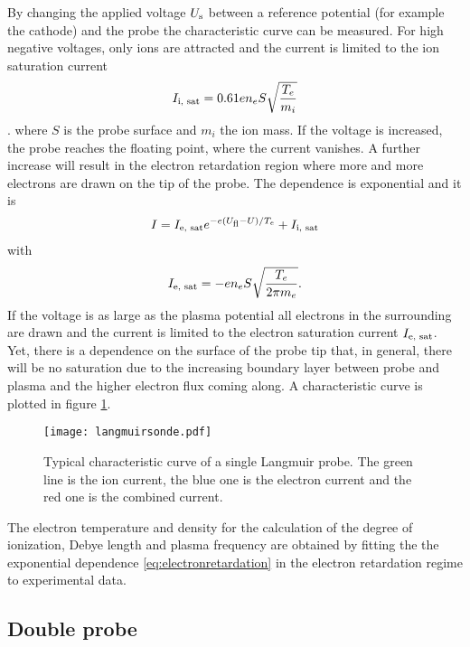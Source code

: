 By changing the applied voltage $U_{\text{\scriptsize s}}$ between a reference potential (for example the cathode) and the probe the characteristic curve can be measured. For high negative voltages, only ions are attracted and the current is limited to the ion saturation current
\begin{align}
	\label{eq:ionsatcurrent}
	I_{\text{\scriptsize i, sat}} = 0.61 e n_e S \sqrt{\frac{T_e}{m_i}}
\end{align}. 
where $S$ is the probe surface and $m_i$ the ion mass. If the voltage is increased, the probe reaches the floating point, where the current vanishes. A further increase will result in the electron retardation region where more and more electrons are drawn on the tip of the probe. The dependence is exponential and it is
\begin{align}
	\label{eq:electronretardation}
	I = I_{\text{\scriptsize e, sat}} e^{-e(U_{\text{\scriptsize fl}} - U)/T_e} + I_{\text{\scriptsize i, sat}}
\end{align}
with\begin{align}
	\label{eq:electronsatcurrent}
	I_{\text{\scriptsize e, sat}} = - e n_e S \sqrt{\frac{T_e}{2 \pi m_e}} \scriptsize{.}
\end{align}
If the voltage is as large as the plasma potential all electrons in the surrounding are drawn and the current is limited to the electron saturation current $I_{\text{\scriptsize e, sat}}$. Yet, there is a dependence on the surface of the probe tip that, in general, there will be no saturation due to the increasing boundary layer between probe and plasma and the higher electron flux coming along. A characteristic curve is plotted in figure \ref{fig:langmuirsingle}.
\begin{figure}[tb]
	\centering
	\texttt{[image: langmuirsonde.pdf]}
	\caption{\label{fig:langmuirsingle}Typical characteristic curve of a single Langmuir probe. The green line is the ion current, the blue one is the electron current and the red one is the combined current.}
\end{figure}
The electron temperature and density for the calculation of the degree of ionization, Debye length and plasma frequency are obtained by fitting the the exponential dependence \eqref{eq:electronretardation} in the electron retardation regime to experimental data.

\subsection{Double probe}\label{subsec:doubleprobe}

